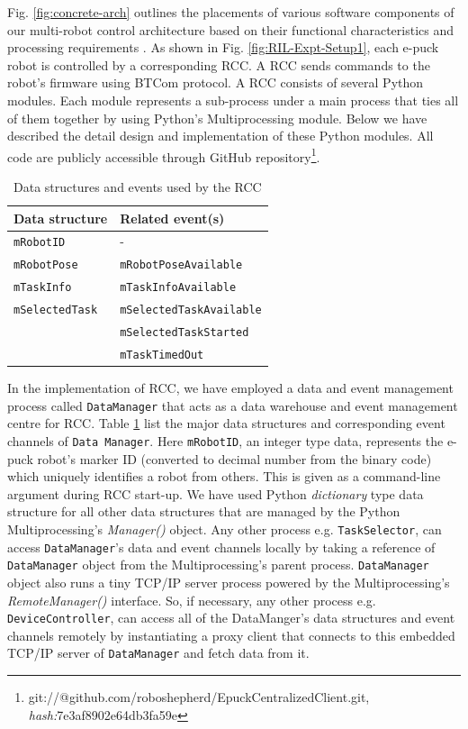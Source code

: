 \documentclass[final,5p,times,twocolumn]{elsarticle}
\begin{document}
Fig. \ref{fig:concrete-arch} outlines the placements of various software components of our multi-robot control architecture based on their functional characteristics and processing requirements \cite{Sarker2010control}. As shown in Fig. \ref{fig:RIL-Expt-Setup1}, each e-puck robot is controlled by a corresponding RCC. A RCC sends commands to the robot's firmware using BTCom protocol. A RCC consists of several Python modules. Each module represents a sub-process under a main process that ties all of them together by using Python's Multiprocessing module. Below we have described the detail design and implementation of these Python modules. All code are publicly accessible through GitHub repository\footnote{git://@github.com/roboshepherd/EpuckCentralizedClient.git,    
\textit{hash:}7e3af8902e64db3fa59e}.
\begin{table}
\caption{Data structures and events used by the RCC}
\begin{center}
\begin{tabular}{|l|l|}
\hline \textbf{Data structure} & \textbf{Related event(s)}\\ 
\hline \texttt{\texttt{mRobotID}} & - \\ 
\hline \texttt{mRobotPose} & \texttt{mRobotPoseAvailable}\\ 
\hline \texttt{mTaskInfo} & \texttt{mTaskInfoAvailable}\\ 
\hline \texttt{mSelectedTask} & \texttt{mSelectedTaskAvailable}\\
 &  \texttt{mSelectedTaskStarted}\\
 &  \texttt{mTaskTimedOut}\\
 \hline 
\end{tabular}
\end{center}
\label{table:data-mgr}
\end{table} 

In the implementation of RCC, we have employed a data and event management process called \texttt{DataManager} that acts as a data warehouse and event management centre for RCC. Table \ref{table:data-mgr} list the major data structures and corresponding event channels of \texttt{Data Manager}. Here \texttt{mRobotID}, an integer type data,  represents the e-puck robot's marker ID (converted to decimal number from the binary code) which uniquely identifies a robot from others. This is given as a command-line argument during RCC start-up. We have used Python {\em dictionary} type data structure for all other data structures that are managed by the Python Multiprocessing's {\em Manager()} object. Any other process e.g. \texttt{TaskSelector}, can access \texttt{DataManager}'s data and event channels locally  by taking a reference of \texttt{DataManager} object from the Multiprocessing's parent process. \texttt{DataManager} object also runs a tiny TCP/IP server process powered by the Multiprocessing's {\em RemoteManager()} interface. So, if necessary,  any other process e.g. \texttt{DeviceController}, can access all of the DataManger's data structures and event channels remotely by instantiating a proxy client  that connects to this embedded TCP/IP server of \texttt{DataManager} and  fetch data from it.
\end{document}
